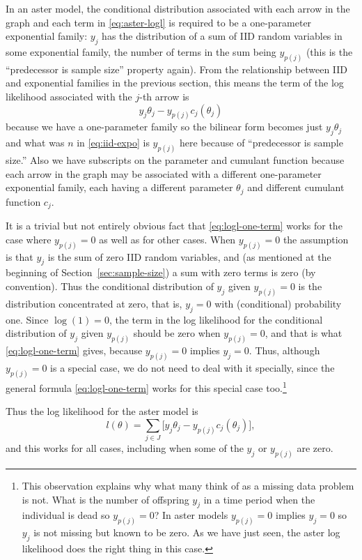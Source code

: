 \documentclass[11pt]{article}
\begin{document}
In an aster model, the conditional distribution associated with each arrow
in the graph and each term in \eqref{eq:aster-logl}
is required to be a one-parameter exponential family: $y_j$ has the
distribution of a sum of IID random variables in some exponential family,
the number of terms in the sum being $y_{p(j)}$ (this is the ``predecessor
is sample size'' property again).  From the relationship between IID and
exponential families in the previous section, this means the term of the
log likelihood associated with the $j$-th arrow is
\begin{equation} \label{eq:logl-one-term}
   y_j \theta_j - y_{p(j)} c_j(\theta_j)
\end{equation}
because we have a one-parameter family so the bilinear form becomes
just $y_j \theta_j$ and what was $n$ in \eqref{eq:iid-expo} is $y_{p(j)}$
here because of ``predecessor is sample size.''  Also we have subscripts on
the parameter and cumulant function because each arrow in the graph may
be associated with a different one-parameter exponential family, each
having a different parameter $\theta_j$ and different cumulant function $c_j$.

It is a trivial but not entirely obvious fact that \eqref{eq:logl-one-term}
works for the case where $y_{p(j)} = 0$ as well as for other cases.
When $y_{p(j)} = 0$ the assumption is that $y_j$ is the sum of zero IID random
variables, and (as mentioned at the beginning of Section~\ref{sec:sample-size})
a sum with zero terms is zero (by convention).  Thus the conditional
distribution of $y_j$ given $y_{p(j)} = 0$ is the distribution concentrated
at zero, that is, $y_j = 0$ with (conditional) probability one.
Since $\log(1) = 0$, the term in the log likelihood for the conditional
distribution of $y_j$ given $y_{p(j)}$ should be zero when $y_{p(j)} = 0$,
and that is what \eqref{eq:logl-one-term} gives, because
$y_{p(j)} = 0$ implies $y_j = 0$.
Thus, although $y_{p(j)} = 0$ is a special case, we do not need to deal with
it specially, since the general formula \eqref{eq:logl-one-term} works for
this special case too.\footnote{This observation explains why what many think
of as a missing data problem is not.  What is the number of offspring $y_j$ in
a time period when the individual is dead so $y_{p(j)} = 0$?  In
aster models $y_{p(j)} = 0$ implies $y_j = 0$ so $y_j$ is not missing but
known to be zero.  As we have just seen, the aster log
likelihood does the right thing in this case.\label{foot:zeros}}

Thus the log likelihood for the aster model is
\begin{equation} \label{eq:logl-cond}
   l(\theta)
   =
   \sum_{j \in J} \bigl[ y_j \theta_j - y_{p(j)} c_j(\theta_j) \bigr],
\end{equation}
and this works for all cases, including when some of the $y_j$ or $y_{p(j)}$
are zero.
\end{document}
